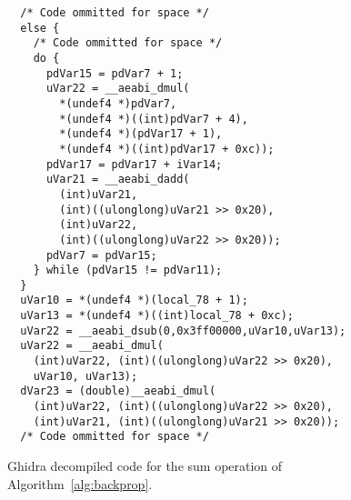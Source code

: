 
\begin{figure}
  \begin{lstlisting}
  /* Code ommitted for space */
  else {
    /* Code ommitted for space */
    do {
      pdVar15 = pdVar7 + 1;
      uVar22 = __aeabi_dmul(
        *(undef4 *)pdVar7,
        *(undef4 *)((int)pdVar7 + 4),
        *(undef4 *)(pdVar17 + 1),
        *(undef4 *)((int)pdVar17 + 0xc));
      pdVar17 = pdVar17 + iVar14;
      uVar21 = __aeabi_dadd(
        (int)uVar21,
        (int)((ulonglong)uVar21 >> 0x20),
        (int)uVar22,
        (int)((ulonglong)uVar22 >> 0x20));
      pdVar7 = pdVar15;
    } while (pdVar15 != pdVar11);
  }
  uVar10 = *(undef4 *)(local_78 + 1);
  uVar13 = *(undef4 *)((int)local_78 + 0xc);
  uVar22 = __aeabi_dsub(0,0x3ff00000,uVar10,uVar13);
  uVar22 = __aeabi_dmul(
    (int)uVar22, (int)((ulonglong)uVar22 >> 0x20),
    uVar10, uVar13);
  dVar23 = (double)__aeabi_dmul(
    (int)uVar22, (int)((ulonglong)uVar22 >> 0x20),
    (int)uVar21, (int)((ulonglong)uVar21 >> 0x20));
  /* Code ommitted for space */
\end{lstlisting}
	\caption{Ghidra decompiled code for the sum operation of Algorithm~\ref{alg:backprop}.}
	\label{fig:ann-decomp}
\end{figure}
